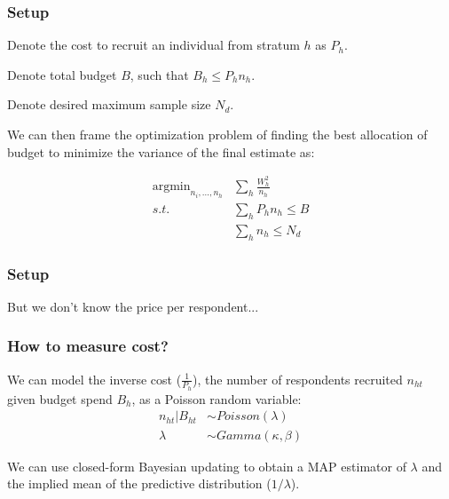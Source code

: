 \documentclass[aspectratio=169]{beamer}
\DeclareMathOperator*{\argmin}{argmin}
\begin{document}
\begin{frame}
\frametitle{Setup}

Denote the cost to recruit an individual from stratum $h$ as $P_h$.

Denote total budget $B$, such that $B_h \leq P_hn_h$.

Denote desired maximum sample size $N_d$.

We can then frame the optimization problem of finding the best allocation of budget to minimize the variance of the final estimate as:


\begin{align*}
\argmin_{n_i,...,n_h}  &\sum_{h}  \frac{W_h^2}{n_h} \\
s.t. &\sum_h P_hn_h \leq B \\
     &\sum_h n_h \leq N_d
\end{align*}

\end{frame}


\begin{frame}
\frametitle{Setup}

But we don't know the price per respondent...

\end{frame}

\begin{frame}
\frametitle{How to measure cost? }

We can model the inverse cost ($\frac{1}{P_h}$), the number of respondents recruited $n_{ht}$ given budget spend $B_h$, as a Poisson random variable:
%
\begin{align*}
n_{ht} | B_{ht} &\sim Poisson(\lambda) \\
\lambda &\sim Gamma(\kappa, \beta)
\end{align*}

We can use closed-form Bayesian updating to obtain a MAP estimator of $\lambda$ and the implied mean of the predictive distribution ($ 1 / \lambda$).

\end{frame}
\end{document}
